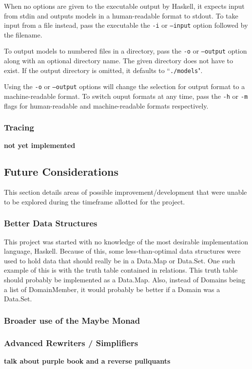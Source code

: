 		When no options are given to the executable output by Haskell, it
		expects input from stdin and outputs models in a human-readable format
		to stdout. To take input from a file instead, pass the executable the
		{\tt -i} or {\tt --input} option followed by the filename.

		To output models to numbered files in a directory, pass the {\tt -o} or
		{\tt --output} option along with an optional directory name. The given
		directory does not have to exist. If the output directory is omitted,
		it defaults to ``{\tt ./models}".

		Using the {\tt -o} or {\tt --output} options will change the selection
		for output format to a machine-readable format. To switch ouput formats
		at any time, pass the {\tt -h} or {\tt -m} flags for human-readable and
		machine-readable formats respectively.

		\subsubsection{Tracing}

		\textbf{not yet implemented}

	\subsection{Future Considerations}

		This section details areas of possible improvement/development that
		were unable to be explored during the timeframe allotted for the
		project.

		\subsubsection{Better Data Structures}

			This project was started with no knowledge of the most desirable
			implementation language, Haskell. Because of this, some
			less-than-optimal data structures were used to hold data that
			should really be in a Data.Map or Data.Set. One such example of this
			is with the truth table contained in relations. This truth table
			should probably be implemented as a Data.Map. Also, instead of
			Domains being a list of DomainMember, it would probably be better
			if a Domain was a Data.Set.

		\subsubsection{Broader use of the Maybe Monad}

		\subsubsection{Advanced Rewriters / Simplifiers}

			\textbf{talk about purple book and a reverse pullquants}
